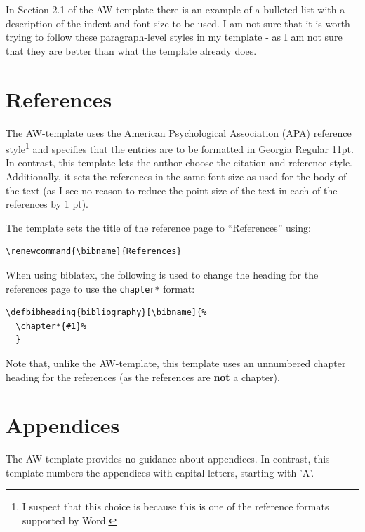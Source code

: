 \documentclass[12pt, twoside]{article}
\begin{document}
In Section 2.1 of the AW-template there is an example of a bulleted list with a description of the indent and font size to be used. I am not sure that it is worth trying to follow these paragraph-level styles in my template - as I am not sure that they are better than what the template already does.



\section{References}
\label{sec:cycle3Refrences}
The AW-template uses the American Psychological Association (APA) reference style\footnote{I suspect that this choice is because this is one of the reference formats supported by Word.} and specifies that the entries are to be formatted in Georgia Regular 11pt. In contrast, this template lets the author choose the citation and reference style. Additionally, it sets the references in the same font size as used for the body of the text (as I see no reason to reduce the point size of the text in each of the references by 1 pt).

The template sets the title of the reference page to ``References'' using:
\begin{lstlisting}[style=latexExampleForAuthors]
\renewcommand{\bibname}{References}
\end{lstlisting}

When using biblatex, the following is used to change the heading for the references page to use the \texttt{chapter*} format:
\begin{lstlisting}[style=latexExampleForAuthors]
\defbibheading{bibliography}[\bibname]{%
  \chapter*{#1}%
  }
\end{lstlisting}

Note that, unlike the AW-template, this template uses an unnumbered chapter heading for the references (as the references are \textbf{not} a chapter).

\section{Appendices}
\label{sec:cycle3Appendices}
The AW-template provides no guidance about appendices. In contrast, this template numbers the appendices with capital letters, starting with 'A'.
\end{document}
